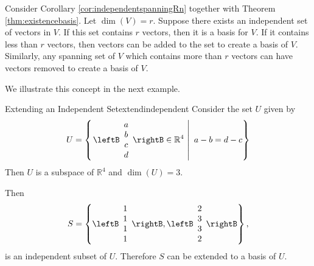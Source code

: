 Consider Corollary \ref{cor:independentspanningRn} together with Theorem \ref{thm:existencebasis}. Let $\dim(V) = r$. Suppose there exists an independent set of vectors in $V$. If this set contains $r$ vectors, then it is a basis for $V$. If it contains less than $r$ vectors, then vectors can be added to the set to create a basis of $V$. Similarly, any spanning set of $V$ which contains more than $r$ vectors can have vectors removed to create a basis of $V$.

We illustrate this concept in the next example.

\begin{example}{Extending an Independent Set}{extendindependent}
Consider the set $U$ given by 
\[ U=\left\{ \left.\leftB\begin{array}{c} a\\ b\\ c\\ d\end{array}\rightB
\in\mathbb{R}^4 ~\right|~ a-b=d-c \right\}\]
Then $U$ is a subspace of $\mathbb{R}^4$ and $\dim(U)=3$.

Then
\[S=\left\{ 
\leftB\begin{array}{c} 1\\ 1\\ 1\\ 1\end{array}\rightB,
\leftB\begin{array}{c} 2\\ 3\\ 3\\ 2\end{array}\rightB \right\},\]
is an independent subset of $U$.
Therefore $S$ can be extended to a basis of $U$.
\end{example}

